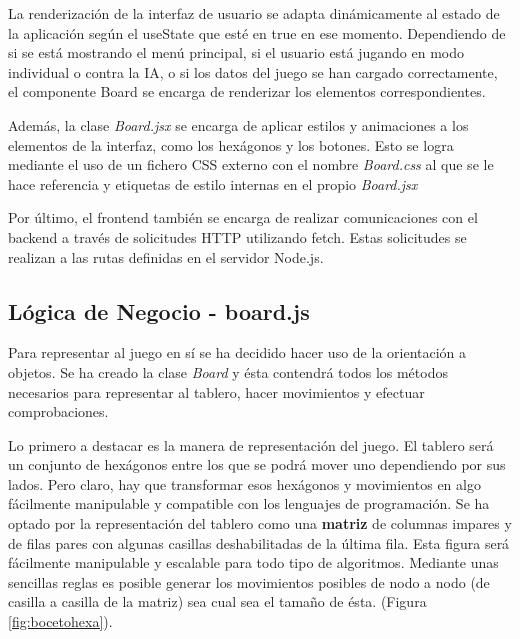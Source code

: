 \documentclass[12pt,epsf,titlepage,a4paper]{article}
\begin{document}
La renderización de la interfaz de usuario se adapta dinámicamente al estado de la aplicación según el useState que esté en true en ese momento. Dependiendo de si se está mostrando el menú principal, si el usuario está jugando en modo individual o contra la IA, o si los datos del juego se han cargado correctamente, el componente Board se encarga de renderizar los elementos correspondientes.

Además, la clase \emph{Board.jsx} se encarga de aplicar estilos y animaciones a los elementos de la interfaz, como los hexágonos y los botones. Esto se logra mediante el uso de un fichero CSS externo con el nombre \emph{Board.css} al que se le hace referencia y etiquetas de estilo internas en el propio \emph{Board.jsx}

Por último, el frontend también se encarga de realizar comunicaciones con el backend a través de solicitudes HTTP utilizando fetch. Estas solicitudes se realizan a las rutas definidas en el servidor Node.js.

\subsection{Lógica de Negocio - board.js}

Para representar al juego en sí se ha decidido hacer uso de la orientación a objetos. Se ha creado la clase \emph{Board} y ésta contendrá todos los métodos necesarios para representar al tablero, hacer movimientos y efectuar comprobaciones.

Lo primero a destacar es la manera de representación del juego. El tablero será un conjunto de hexágonos entre los que se podrá mover uno dependiendo por sus lados. Pero claro, hay que transformar esos hexágonos y movimientos en algo fácilmente manipulable y compatible con los lenguajes de programación. Se ha optado por la representación del tablero como una \textbf{matriz} de columnas impares y de filas pares con algunas casillas deshabilitadas de la última fila. Esta figura será fácilmente manipulable y escalable para todo tipo de algoritmos. Mediante unas sencillas reglas es posible generar los movimientos posibles de nodo a nodo (de casilla a casilla de la matriz) sea cual sea el tamaño de ésta. (Figura \ref{fig:bocetohexa}).
\end{document}
